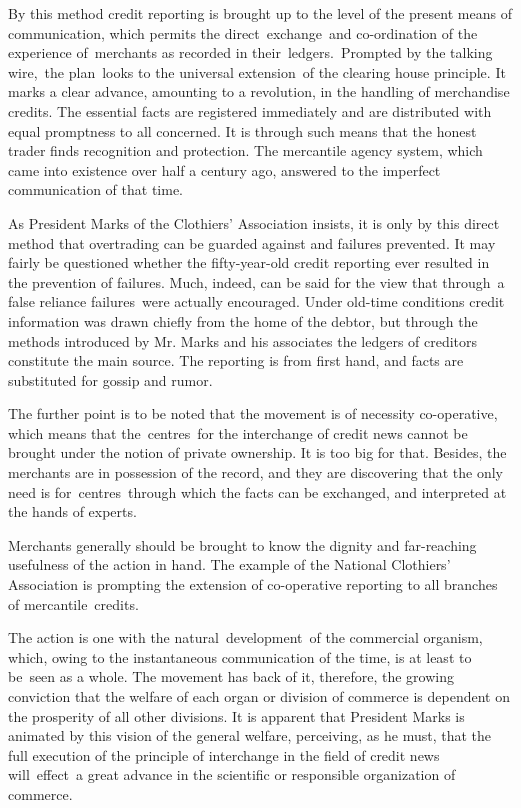 \documentclass[openany,nobib]{tufte-book}
\begin{document}
By this method credit reporting is brought up to the level of the
present means of communication, which permits the direct~exchange~and
co-ordination of the experience of~merchants as recorded in
their~ledgers.~Prompted by the talking wire,~the plan~looks to the
universal extension~of the clearing house principle. It marks a clear
advance, amounting to a revolution, in the handling of merchandise
credits. The essential facts are registered immediately and are
distributed with equal promptness to all concerned. It is through such
means that the honest trader finds recognition and protection. The
mercantile agency system, which came into existence over half a century
ago, answered to the imperfect communication of that time.~

As President Marks of the Clothiers' Association insists, it is only by
this direct method that overtrading can be guarded against and failures
prevented. It may fairly be questioned whether the fifty-year-old credit
reporting ever resulted in the prevention of failures. Much, indeed, can
be said for the view that through~a false reliance failures~were
actually encouraged. Under old-time conditions credit information was
drawn chiefly from the home of the debtor, but through the methods
introduced by Mr. Marks and his associates the ledgers of creditors
constitute the main source. The reporting is from first hand, and facts
are substituted for gossip and rumor.~

The further point is to be noted that the movement is of necessity
co-operative, which means that the~centres~for the interchange of credit
news cannot be brought under the notion of private ownership. It is too
big for that. Besides, the merchants are in possession of the record,
and they are discovering that the only need is for~centres~through which
the facts can be exchanged, and interpreted at the hands of experts.~

Merchants generally should be brought to know the dignity and
far-reaching usefulness of the action in hand. The example of the
National Clothiers' Association is prompting the extension of
co-operative reporting to all branches of mercantile~credits.~

The action is one with the natural~development~of the commercial
organism, which, owing to the instantaneous communication of the time,
is at least to be~seen as a whole. The movement has back of it,
therefore, the growing conviction that the welfare of each organ or
division of commerce is dependent on the prosperity of all other
divisions. It is apparent that President Marks is animated by this
vision of the general welfare, perceiving, as he must, that the full
execution of the principle of interchange in the field of credit news
will~effect~a great advance in the scientific or responsible
organization of commerce. ~
\end{document}
